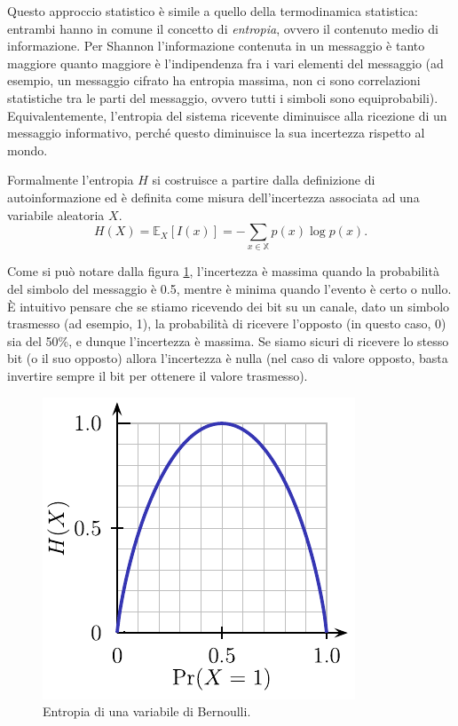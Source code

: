 Questo approccio statistico è simile a quello della termodinamica statistica: entrambi hanno in comune il concetto di \emph{entropia}, ovvero il contenuto medio di informazione. Per Shannon l'informazione contenuta in un messaggio è tanto maggiore quanto maggiore è l'indipendenza fra i vari elementi del messaggio (ad esempio,  un messaggio cifrato ha entropia massima, non ci sono correlazioni statistiche tra le parti del messaggio, ovvero tutti i simboli sono equiprobabili). Equivalentemente, l'entropia del sistema ricevente diminuisce alla ricezione di un messaggio informativo, perché questo diminuisce la sua incertezza rispetto al mondo.

Formalmente l'entropia $H$ si costruisce a partire dalla definizione di autoinformazione ed è definita come misura dell'incertezza associata ad una variabile aleatoria $X$.
\begin{equation}
H(X) = \mathbb{E}_{X} [I(x)] = -\sum_{x \in \mathbb{X}} p(x) \log p(x).	
\end{equation}

Come si può notare dalla figura \ref{fig:entropia}, l'incertezza è massima quando la probabilità del simbolo del messaggio è 0.5, mentre è minima quando l'evento è certo o nullo. È intuitivo pensare che se stiamo ricevendo dei bit su un canale, dato un simbolo trasmesso (ad esempio, 1), la probabilità di ricevere l'opposto (in questo caso, 0) sia del 50\%, e dunque l'incertezza è massima. Se siamo sicuri di ricevere lo stesso bit (o il suo opposto) allora l'incertezza è nulla (nel caso di valore opposto, basta invertire sempre il bit per ottenere il valore trasmesso).
\begin{figure}[hbt]
  \centering
  \includegraphics{img/Binary_entropy_plot}
  \caption{Entropia di una variabile di Bernoulli.}
  \label{fig:entropia}
\end{figure}

